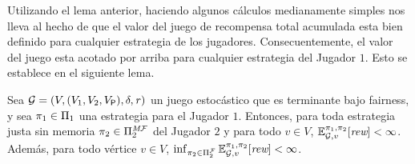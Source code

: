 



Utilizando el lema anterior, haciendo algunos cálculos medianamente simples nos lleva al hecho de que el valor del juego de recompensa total acumulada esta bien definido para cualquier estrategia de los jugadores.
%
Consecuentemente, el valor del juego esta acotado por arriba para cualquier estrategia del Jugador $1$.
%
Esto se establece en el siguiente lema.

\begin{lemma}\label{lm:memoryless-strat-p2-bounded-expectation}
  Sea $\mathcal{G}= (V, (V_1, V_2, V_{\mathsf{P}}), \delta, \mathit{r})$ un
  juego estocástico que es terminante bajo fairness, y sea
  $\pi_{1} \in \Pi_{1}$ una estrategia para el Jugador $1$.
  Entonces, para toda estrategia justa sin memoria
  $\pi_{2} \in \Pi^{\textit{M}\mathcal{F}}_{2}$ del Jugador $2$
  y para todo $v \in V$,
  $\mathbb{E}^{\pi_{1}, \pi_{2}}_{\mathcal{G},v}[\textit{rew}] < \infty$.
  Además, para todo vértice $v \in V$,
  $\inf_{\pi_{2} \in \Pi^{\mathcal{F}}_{2}} \mathbb{E}^{\pi_{1}, \pi_{2}}_{\mathcal{G},v}[\textit{rew}] < \infty$.
\end{lemma}


